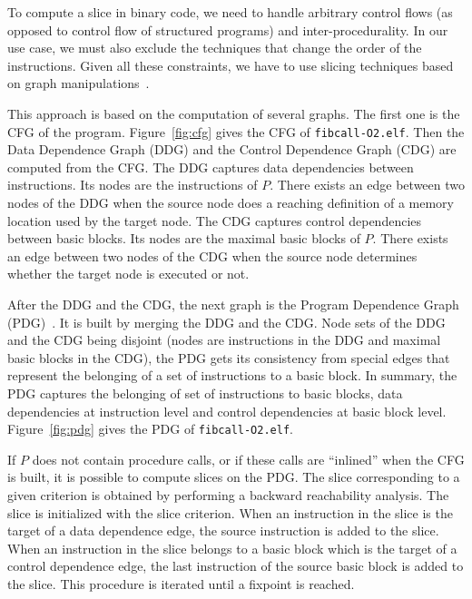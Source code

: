   To compute a slice in binary code, we need to handle arbitrary control flows
  (as opposed to control flow of structured programs) and inter-procedurality.
  In our use case, we must also exclude the techniques that change the order of
  the instructions.  Given all these constraints, we have to use slicing
  techniques based on graph manipulations~\cite{KJL03}.

  This approach is based on the computation of several graphs. The first one is
  the CFG of the program. Figure~\ref{fig:cfg} gives the CFG of
  \verb|fibcall-O2.elf|. Then the Data Dependence Graph (DDG) and the Control
  Dependence Graph (CDG) are computed from the CFG. The DDG captures data
  dependencies between instructions. Its nodes are the instructions of $P$.
  There exists an edge between two nodes of the DDG when the source node does a
  reaching definition of a memory location used by the target node. The CDG
  captures control dependencies between basic blocks. Its nodes are the maximal
  basic blocks of $P$. There exists an edge between two nodes of the CDG when
  the source node determines whether the target node is executed or not.

  After the DDG and the CDG, the next graph is the Program Dependence Graph
  (PDG)~\cite{FOW87}. It is built by merging the DDG and the CDG. Node
  sets of the DDG and the CDG being disjoint (nodes are instructions in the DDG and
  maximal basic blocks in the CDG), the PDG gets its consistency from special
  edges that represent the belonging of a set of instructions to a basic block. In
  summary, the PDG captures the belonging of set of instructions to basic
  blocks, data dependencies at instruction level and control dependencies at
  basic block level. Figure~\ref{fig:pdg} gives the PDG of
  \verb|fibcall-O2.elf|.

  If $P$ does not contain procedure calls, or if these calls are ``inlined''
  when the CFG is built, it is possible to compute slices on the PDG. The slice
  corresponding to a given criterion is obtained by performing a backward
  reachability analysis. The slice is initialized with the slice criterion.
  When an instruction in the slice is the target of a data dependence edge, the
  source instruction is added to the slice. When an instruction in the slice
  belongs to a basic block which is the target of a control dependence edge,
  the last instruction of the source basic block is added to the slice. This
  procedure is iterated until a fixpoint is reached.
  
